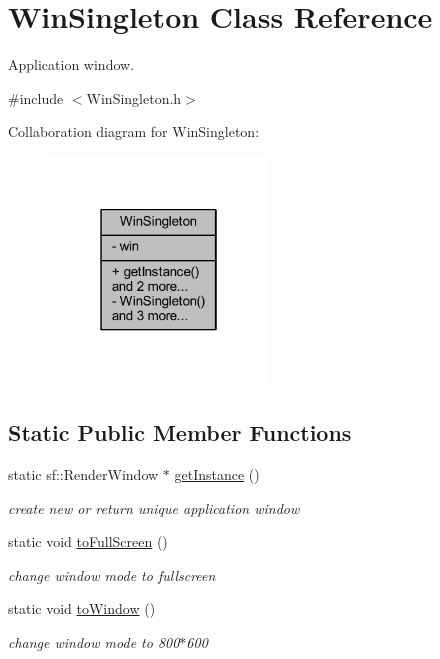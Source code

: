 \hypertarget{class_win_singleton}{}\section{Win\+Singleton Class Reference}
\label{class_win_singleton}


Application window.  




{\ttfamily \#include $<$Win\+Singleton.\+h$>$}



Collaboration diagram for Win\+Singleton\+:
\nopagebreak
\begin{figure}[H]
\begin{center}
\leavevmode
\includegraphics[width=166pt]{class_win_singleton__coll__graph}
\end{center}
\end{figure}
\subsection*{Static Public Member Functions}
\begin{DoxyCompactItemize}
\item 
static sf\+::\+Render\+Window $\ast$ \hyperlink{class_win_singleton_a82935bb60c8e4bb14350ac45813b33ca}{get\+Instance} ()
\begin{DoxyCompactList}\small\item\em create new or return unique application window \end{DoxyCompactList}\item 
\mbox{\label{class_win_singleton_a58684b65df9dadcdc798faba86aeb0b6}} 
static void \hyperlink{class_win_singleton_a58684b65df9dadcdc798faba86aeb0b6}{to\+Full\+Screen} ()
\begin{DoxyCompactList}\small\item\em change window mode to fullscreen \end{DoxyCompactList}\item 
\mbox{\label{class_win_singleton_abba34d9cbdf6a9ff14da654b2b88aba3}} 
static void \hyperlink{class_win_singleton_abba34d9cbdf6a9ff14da654b2b88aba3}{to\+Window} ()
\begin{DoxyCompactList}\small\item\em change window mode to 800$\ast$600 \end{DoxyCompactList}\end{DoxyCompactItemize}
